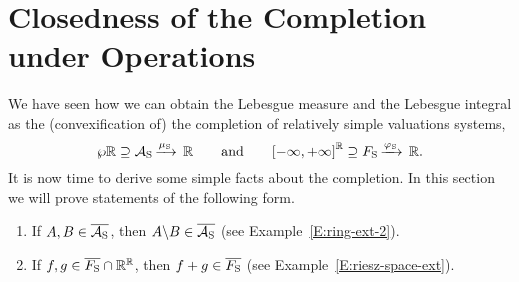 \section{Closedness of the Completion under Operations}
\label{S:closedness}
\noindent
We have seen how we can
obtain the Lebesgue measure and the Lebesgue integral
as the (convexification of) the completion
of relatively simple valuations systems,
\begin{equation*}
\wp{\mathbb{R}} \supseteq \mathcal{A}_{\mathrm{S}}\,\smash{\xrightarrow{\mu_{\mathrm{S}}}\,\mathbb{R}}\qquad\text{and}\qquad{[-\infty,+\infty]}^{\mathbb{R}} \supseteq F_{\mathrm{S}}\,\smash{\xrightarrow{\varphi_{\mathrm{S}}}\,\mathbb{R}}.
\end{equation*}
It is now time to derive some simple facts
about the completion.
In this section we will prove
statements of the following form.
\begin{enumerate}
\item
If $A,B\in\overline{\mathcal{A}_{\mathrm{S}}}$,
then $A\backslash B \in\overline{\mathcal{A}_{\mathrm{S}}}$
(see Example~\ref{E:ring-ext-2}).

\item 
If $f,g\in \overline{F_{\mathrm{S}}} \cap \mathbb{R}^{\mathbb{R}}$,
then $f+g \in \overline{F_{\mathrm{S}}}$
(see Example~\ref{E:riesz-space-ext}).
\end{enumerate}

